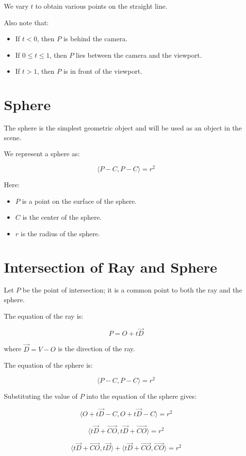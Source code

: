 \documentclass[conference]{IEEEtran}
\begin{document}
We vary $t$ to obtain various points on the straight line.

Also note that:
\begin{itemize}
    \item If $t < 0$, then $P$ is behind the camera.
    \item If $0 \leq t \leq 1$, then $P$ lies between the camera and the viewport.
    \item If $t > 1$, then $P$ is in front of the viewport.
\end{itemize}

\section{Sphere}

The sphere is the simplest geometric object and will be used as an object in the scene.

We represent a sphere as:

$$\langle P - C, P - C \rangle = r^2$$

Here:
\begin{itemize}
    \item $P$ is a point on the surface of the sphere.
    \item $C$ is the center of the sphere.
    \item $r$ is the radius of the sphere.
\end{itemize}


\section{Intersection of Ray and Sphere}

Let $P$ be the point of intersection; it is a common point to both the ray and the sphere.

The equation of the ray is:

$$P = O + t \vec{D}$$

where $\vec{D} = V - O$ is the direction of the ray.

The equation of the sphere is:

$$\langle P - C, P - C \rangle = r^2$$

Substituting the value of $P$ into the equation of the sphere gives:

$$\langle O + t \vec{D} - C, O + t \vec{D} - C \rangle = r^2$$

$$\langle t \vec{D} + \vec{CO}, t \vec{D} + \vec{CO} \rangle = r^2$$

$$\langle t \vec{D} + \vec{CO}, t \vec{D} \rangle + \langle t \vec{D} + \vec{CO}, \vec{CO} \rangle = r^2$$
\end{document}
